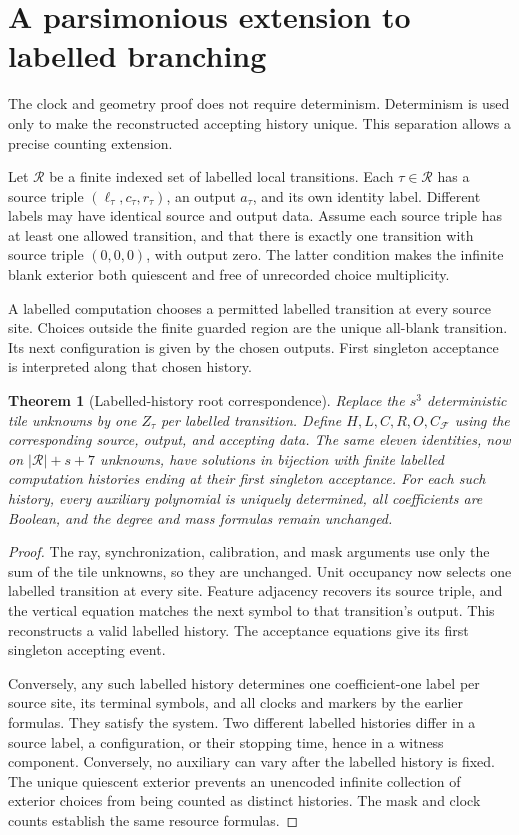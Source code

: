 \documentclass[11pt,letterpaper]{article}
\numberwithin{equation}{section}
\newtheorem{theorem}{Theorem}[section]
\theoremstyle{definition}
\newcommand{\F}{\mathcal F}
\newcommand{\CF}{C_{\F}}
\begin{document}
\section{A parsimonious extension to labelled branching}
\label{pwh:oc:sec:branching}

The clock and geometry proof does not require determinism. Determinism
is used only to make the reconstructed accepting history unique. This
separation allows a precise counting extension.

Let $\mathcal R$ be a finite indexed set of labelled local transitions.
Each $\tau\in\mathcal R$ has a source triple
$(\ell_\tau,c_\tau,r_\tau)$, an output $a_\tau$, and its own identity
label. Different labels may have identical source and output data.
Assume each source triple has at least one allowed transition, and that
there is exactly one transition with source triple $(0,0,0)$, with
output zero. The latter condition makes the infinite blank exterior
both quiescent and free of unrecorded choice multiplicity.

A labelled computation chooses a permitted labelled transition at every
source site. Choices outside the finite guarded region are the unique
all-blank transition. Its next configuration is given by the chosen
outputs. First singleton acceptance is interpreted along that chosen
history.

\begin{theorem}[Labelled-history root correspondence]
\label{pwh:oc:thm:branching}
Replace the $s^3$ deterministic tile unknowns by one $Z_\tau$ per labelled
transition. Define $H,L,C,R,O,\CF$ using the corresponding source,
output, and accepting data. The same eleven identities, now on
$|\mathcal R|+s+7$ unknowns, have solutions in bijection with finite
labelled computation histories ending at their first singleton acceptance.
For each such history, every auxiliary polynomial is uniquely determined,
all coefficients are Boolean, and the degree and mass formulas remain
unchanged.
\end{theorem}

\begin{proof}
The ray, synchronization, calibration, and mask arguments use only the
sum of the tile unknowns, so they are unchanged. Unit occupancy now
selects one labelled transition at every site. Feature adjacency recovers
its source triple, and the vertical equation matches the next symbol
to that transition's output. This reconstructs a valid labelled history.
The acceptance equations give its first singleton accepting event.

Conversely, any such labelled history determines one coefficient-one
label per source site, its terminal symbols, and all clocks and markers
by the earlier formulas. They satisfy the system. Two different labelled
histories differ in a source label, a configuration, or their stopping
time, hence in a witness component. Conversely, no auxiliary can vary
after the labelled history is fixed. The unique quiescent exterior
prevents an unencoded infinite collection of exterior choices from being
counted as distinct histories. The mask and clock counts establish the
same resource formulas.
\end{proof}
\end{document}
